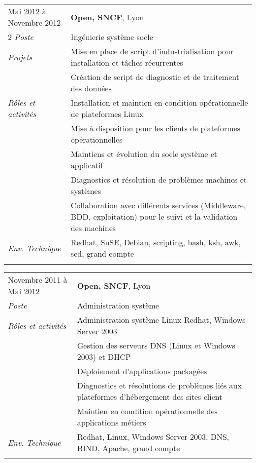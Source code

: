 \documentclass[a4paper,8pt]{article}
\begin{document}
\begin{tabular}{P{3.5cm}|p{13cm}}
Mai 2012 à Novembre 2012	& \textbf{Open, SNCF}, Lyon\\2
\textsl{Poste}			& Ingénierie système socle\\
\textsl{Projets}		& Mise en place de script d'industrialisation pour installation et tâches récurrentes\\
				& Création de script de diagnostic et de traitement des données\\
\textsl{Rôles et activités}	& Installation et maintien en condition opérationnelle de plateformes Linux\\
				& Mise à disposition pour les clients de plateformes opérationnelles\\
				& Maintiens et évolution du socle système et applicatif\\
				& Diagnostics et résolution de problèmes machines et systèmes\\
				& Collaboration avec différents services (Middleware, BDD, exploitation) pour le suivi et la validation des machines\\
\textsl{Env. Technique}		& Redhat, SuSE, Debian, scripting, bash, ksh, awk, sed, grand compte\\
 & \\
\end{tabular}

\begin{tabular}{P{3.5cm}|p{13cm}}
Novembre 2011 à Mai 2012	& \textbf{Open, SNCF}, Lyon\\
\textsl{Poste}			& Administration système\\
\textsl{Rôles et activités} 	& Administration système Linux Redhat, Windows Server 2003\\
				& Gestion des serveurs DNS (Linux et Windows 2003) et DHCP\\
				& Déploiement d'applications packagées\\
				& Diagnostics et résolutions de problèmes liés aux plateformes d'hébergement des sites client\\
				& Maintien en condition opérationnelle des applications métiers\\
\textsl{Env. Technique}		& Redhat, Linux, Windows Server 2003, DNS, BIND, Apache, grand compte\\
 & \\
\end{tabular}
\end{document}
